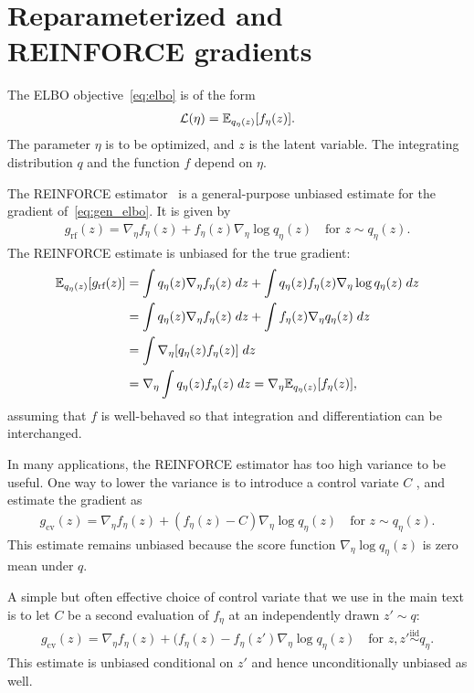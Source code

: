 \section{Reparameterized and REINFORCE gradients}
\label{sec:reparam_details}

The ELBO objective~\eqref{eq:elbo} is of the form
\begin{align}
    \mathcal{L}(\eta) = \mathbb{E}_{q_\eta(z)}[f_\eta(z)].
    \label{eq:gen_elbo}
\end{align}
The parameter $\eta$ is to be optimized, and $z$ is the latent variable. The integrating distribution $q$ and the function $f$ depend on $\eta$.

The REINFORCE estimator~\citep{Williams1992reinforce} is a general-purpose unbiased estimate for the gradient of~\eqref{eq:gen_elbo}.
It is given by
\begin{align}
    g_{\textrm{rf}}(z) = \nabla_\eta f_\eta(z) +
            f_\eta(z)  \nabla_\eta \log q_\eta(z)
    \quad \text{for }
    z\sim q_\eta(z).
\end{align}
The REINFORCE estimate is unbiased for the true gradient:
\begin{align}
    \mathbb{E}_{q_\eta(z)}[g_{\textrm{rf}}(z)] &=
    \int q_\eta(z) \nabla_\eta f_\eta(z) \; dz+
    \int q_\eta(z) f_\eta(z)  \nabla_\eta \log q_\eta(z)\; dz \\
    &= \int q_\eta(z) \nabla_\eta f_\eta(z) \; dz+
    \int f_\eta(z) \nabla_\eta q_\eta(z)  \; dz \\
    &= \int \nabla_\eta[q_\eta(z) f_\eta(z)] \; dz \\
    &= \nabla_\eta \int q_\eta(z) f_\eta(z) \; dz
    = \nabla_\eta \mathbb{E}_{q_\eta(z)}[f_\eta(z)],
\end{align}
assuming that $f$ is well-behaved so that integration and differentiation can be interchanged.

In many applications,
the REINFORCE estimator has too high variance to be useful. One way to lower the variance is to introduce a control variate $C$
\citep{ranganath2013black}, and estimate the gradient as 
\begin{align}
    g_{\textrm{cv}}(z) = \nabla_\eta f_\eta(z) +
        (f_\eta(z) - C)  \nabla_\eta \log q_\eta(z)
    \quad \text{for }
    z\sim q_\eta(z).
\end{align}
This estimate remains unbiased because the score function 
$\nabla_\eta \log q_\eta(z)$ is zero mean under $q$.

A simple but often effective choice of control variate that we use in the main text is to let 
$C$ be a second evaluation of $f_\eta$ at an independently drawn $z'\sim q$:
\begin{align}
    g_{\textrm{cv}}(z) = \nabla_\eta f_\eta(z) +
        (f_\eta(z) - f_\eta(z')  \nabla_\eta \log q_\eta(z)
    \quad \text{for }
    z, z' \overset{\mathrm{iid}} \sim q_\eta.
    \label{eq:control_var}
\end{align}
This estimate is unbiased conditional on $z'$ and hence unconditionally unbiased as well. 


